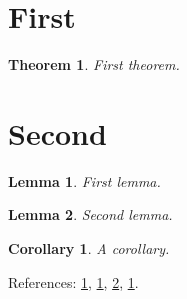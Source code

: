 \documentclass{article}
\newtheorem{theorem}{Theorem}[section]
\newtheorem{lemma}[lemma]{Lemma}
\newtheorem{corollary}[corollary]{Corollary}
\begin{document}
\section{First}
\begin{theorem}\label{thm:a}
First theorem.
\end{theorem}
\section{Second}
\begin{lemma}\label{lem:a}
First lemma.
\end{lemma}
\begin{lemma}\label{lem:b}
Second lemma.
\end{lemma}
\begin{corollary}\label{cor:a}
A corollary.
\end{corollary}
References: \ref{thm:a}, \ref{lem:a}, \ref{lem:b}, \ref{cor:a}.
\end{document}
